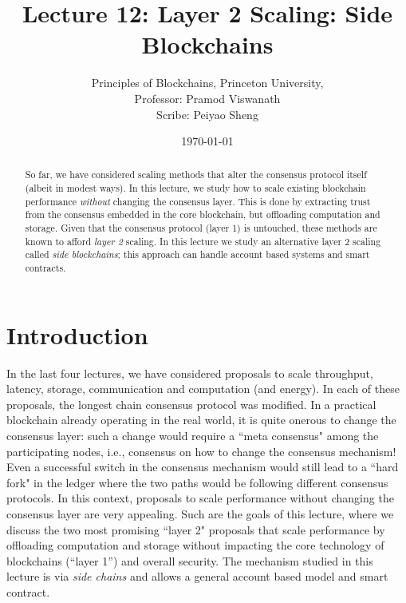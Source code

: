 \documentclass{article}
\title{Lecture 12:  Layer 2 Scaling: Side Blockchains}
\author{
Principles of Blockchains, Princeton University, \\ 
Professor: Pramod Viswanath \\ 
Scribe: Peiyao Sheng\\
}
\date{\today}
\begin{document}
\maketitle

\begin{abstract}
    So far, we have considered scaling methods that alter the consensus protocol itself (albeit in modest ways). In this lecture, we study how to scale existing blockchain performance {\em without} changing the consensus layer. This is done  by extracting trust from the  consensus embedded in the core blockchain, but offloading computation and storage. Given that the consensus protocol (layer 1) is untouched, these methods are known to afford {\em layer 2} scaling.  In this lecture we study an alternative layer 2 scaling called  {\em side blockchains}; this approach can handle account based systems and smart contracts.
\end{abstract}



\section*{Introduction}
In the last four lectures, we have considered proposals to scale throughput, latency, storage, communication and computation (and energy). In each of these proposals, the longest chain consensus protocol was modified. In a practical blockchain already operating in the real world, it is quite onerous to change the consensus layer: such a change would require a ``meta consensus" among the participating nodes, i.e., consensus on how to change the consensus mechanism! Even a successful switch in the consensus mechanism would still lead to a ``hard fork" in the ledger where the two paths would be following different consensus protocols. In this context, proposals to scale performance without changing the consensus layer are very appealing. Such are the goals of this lecture, where we discuss the two most promising ``layer 2"  proposals that scale performance by offloading computation and storage  without impacting the core technology of blockchains (``layer 1'') and overall security. The  mechanism studied in this lecture is via {\em side chains} and allows a general account based model and smart contract. 
\end{document}
